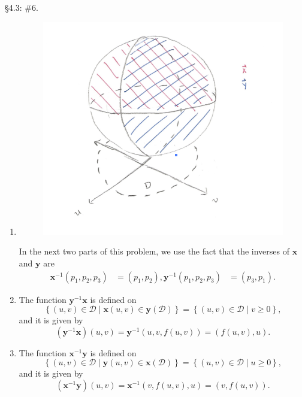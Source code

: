 \documentclass[10pt]{report}
\begin{document}
\begin{exer}[]
\S 4.3: \#6.
\end{exer}
\begin{enumerate}
	\item 
		\begin{figure}[H]
			\centering
			\includegraphics[scale=0.6]{fig/4.3.png}
		\end{figure}
		

		In the next two parts of this problem, we use the fact that the inverses of $\mathbf{x}$ and $\mathbf{y}$ are
		\begin{align*}
			\mathbf{x}^{-1}(p_1,p_2,p_3) &= (p_1,p_2),
			\mathbf{y}^{-1}(p_1,p_2,p_3) &= (p_3,p_1).
		\end{align*}

	\item The function $\mathbf{y}^{-1}\mathbf{x}$ is defined on
		\[
			\left\{ (u,v) \in \mathcal{D} \;|\; \mathbf{x}(u,v) \in \mathbf{y}(\mathcal{D}) \right\} = \left\{ (u,v) \in \mathcal{D} \;|\; v \geq 0 \right\},
		\] and it is given by
		\[
			(\mathbf{y}^{-1}\mathbf{x})(u,v) = \mathbf{y}^{-1}(u,v,f(u,v)) = (f(u,v),u).
		\] 

	\item The function $\mathbf{x}^{-1}\mathbf{y}$ is defined on
                \[                        \left\{ (u,v) \in \mathcal{D} \;|\; \mathbf{y}(u,v) \in \mathbf{x}(\mathcal{D}) \right\} = \left\{ (u,v) \in \mathcal{D} \;|\; u \geq 0 \right\},
                \] and it is given by
                \[
                        (\mathbf{x}^{-1}\mathbf{y})(u,v) = \mathbf{x}^{-1}(v,f(u,v),u) = (v,f(u,v)).
                \]
\end{enumerate}
\end{document}
